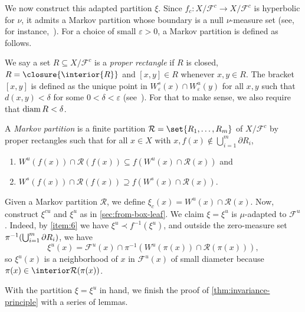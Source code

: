 \documentclass[../main]{subfiles}
\begin{document}
We now construct this adapted partition \(\xi\). Since \(f_c \colon X/\mathcal{F}^c \to X/\mathcal{F}^c\) is hyperbolic for \(\nu\), it admits a Markov partition whose boundary is a null \(\nu\)-measure set (see, for instance,~\cite[Theorem 3.12.]{bowenEquilibriumStatesErgodic2008}). For a choice of small \(\varepsilon > 0\), a Markov partition is defined as follows.

\begin{definition}
  We say a set \(R \subseteq X/\mathcal{F}^c\) is a \emph{proper rectangle} if \(R\) is closed, \(R = \closure{\interior{R}}\) and \([x,y] \in R\) whenever \(x, y \in R\). The bracket \([x,y]\) is defined as the unique point in \(W^s_{\varepsilon}(x)\cap W^u_{\varepsilon}(y)\) for all \(x,y\) such that \(d(x,y) < \delta\) for some \(0 < \delta < \varepsilon\) (see~\cite[3.3. Canonical Coordinates]{bowenEquilibriumStatesErgodic2008}). For that to make sense, we also require that \(\operatorname{diam} R < \delta\).
\end{definition}

\begin{definition}
  A \emph{Markov partition} is a finite partition \(\mathcal{R} = \set{R_1,\dots,R_m}\) of \(X/\mathcal{F}^c\) by proper rectangles such that for all \(x \in X\) with \(x, f(x) \notin \bigcup_{i = 1}^m \partial R_i\),
  \begin{enumerate}
  \item\label{item:6} \(W^u(f(x)) \cap \mathcal{R}(f(x)) \subseteq f(W^u(x)\cap \mathcal{R}(x))\) and
  \item \(W^s(f(x)) \cap \mathcal{R}(f(x)) \supseteq f(W^s(x)\cap \mathcal{R}(x))\).
  \end{enumerate}
\end{definition}

Given a Markov partition \(\mathcal{R}\), we define \(\xi_c(x) = W^u(x) \cap \mathcal{R}(x)\). Now, construct \(\xi^{cu}\) and \(\xi^u\) as in \cref{sec:from-box-leaf}. We claim \(\xi = \xi^{u}\) is \(\mu\)-adapted to \(\mathcal{F}^u\). Indeed, by \cref{item:6} we have \(\xi^{u} \prec f^{-1}(\xi^{u})\), and outside the zero-measure set \(\pi ^{-1}\rpar*{\bigcup_{i = 1}^m \partial R_i}\), we have \[\xi^{u}(x) = \mathcal{F}^u(x) \cap \pi^{-1}(W^u(\pi(x)) \cap \mathcal{R}(\pi(x))),\]
so \(\xi^{u}(x)\) is a neighborhood of \(x\) in \(\mathcal{F}^u(x)\) of small diameter because \(\pi(x) \in \interior \mathcal{R}(\pi(x))\).

With the partition \(\xi = \xi^u\) in hand, we finish the proof of \cref{thm:invariance-principle} with a series of lemmas.
\end{document}
